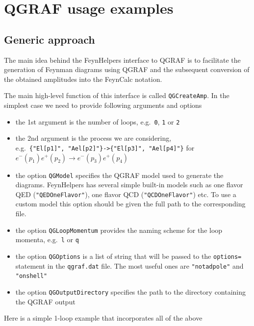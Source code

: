 \documentclass[../FeynHelpersManual.tex]{subfiles}
\begin{document}
\hypertarget{qgraf usage examples}{
\section{QGRAF usage examples}\label{qgraf usage examples}}

\subsection{Generic approach}\label{generic-approach}

The main idea behind the FeynHelpers interface to QGRAF is to facilitate
the generation of Feynman diagrams using QGRAF and the subsequent
conversion of the obtained amplitudes into the FeynCalc notation.

The main high-level function of this interface is called
\texttt{QGCreateAmp}. In the simplest case we need to provide following
arguments and options

\begin{itemize}
\tightlist
\item
  the 1st argument is the number of loops, e.g.~\texttt{0}, \texttt{1}
  or \texttt{2}
\item
  the 2nd argument is the process we are considering,
  e.g.~\texttt{\{\allowbreak{}"El[\allowbreak{}p1]",\ \allowbreak{}"Ael[\allowbreak{}p2]"\}->\{\allowbreak{}"El[\allowbreak{}p3]",\ \allowbreak{}"Ael[\allowbreak{}p4]"\}}
  for \(e^- (p_1) e^+ (p_2) \to e^- (p_3) e^+ (p_4)\)
\item
  the option \texttt{QGModel} specifies the QGRAF model used to generate
  the diagrams. FeynHelpers has several simple built-in models such as
  one flavor QED (\texttt{"QEDOneFlavor"}), one flavor QCD
  (\texttt{"QCDOneFlavor"}) etc. To use a custom model this option
  should be given the full path to the corresponding file.
\item
  the option \texttt{QGLoopMomentum} provides the naming scheme for the
  loop momenta, e.g.~\texttt{l} or \texttt{q}
\item
  the option \texttt{QGOptions} is a list of string that will be passed
  to the \texttt{options=} statement in the \texttt{qgraf.dat} file. The
  most useful ones are \texttt{"notadpole"} and \texttt{"onshell"}
\item
  the option \texttt{QGOutputDirectory} specifies the path to the
  directory containing the QGRAF output
\end{itemize}

Here is a simple 1-loop example that incorporates all of the above
\end{document}
